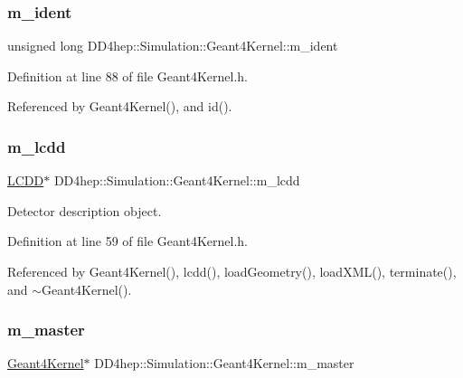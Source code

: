 \subsubsection{\texorpdfstring{m\+\_\+ident}{m\_ident}}
{\footnotesize\ttfamily unsigned long D\+D4hep\+::\+Simulation\+::\+Geant4\+Kernel\+::m\+\_\+ident\hspace{0.3cm}{\ttfamily [protected]}}



Definition at line 88 of file Geant4\+Kernel.\+h.



Referenced by Geant4\+Kernel(), and id().

\hypertarget{class_d_d4hep_1_1_simulation_1_1_geant4_kernel_a0181177a7c4b6862a83b3a34a64a3ce9}{}\label{class_d_d4hep_1_1_simulation_1_1_geant4_kernel_a0181177a7c4b6862a83b3a34a64a3ce9} 
\subsubsection{\texorpdfstring{m\+\_\+lcdd}{m\_lcdd}}
{\footnotesize\ttfamily \hyperlink{class_d_d4hep_1_1_simulation_1_1_geant4_kernel_a190e652b62ebce3db3372c4265ffa5a3}{L\+C\+DD}$\ast$ D\+D4hep\+::\+Simulation\+::\+Geant4\+Kernel\+::m\+\_\+lcdd\hspace{0.3cm}{\ttfamily [protected]}}



Detector description object. 



Definition at line 59 of file Geant4\+Kernel.\+h.



Referenced by Geant4\+Kernel(), lcdd(), load\+Geometry(), load\+X\+M\+L(), terminate(), and $\sim$\+Geant4\+Kernel().

\hypertarget{class_d_d4hep_1_1_simulation_1_1_geant4_kernel_a5d1ef9677e88ba8fc503d1cb70b84cf8}{}\label{class_d_d4hep_1_1_simulation_1_1_geant4_kernel_a5d1ef9677e88ba8fc503d1cb70b84cf8} 
\subsubsection{\texorpdfstring{m\+\_\+master}{m\_master}}
{\footnotesize\ttfamily \hyperlink{class_d_d4hep_1_1_simulation_1_1_geant4_kernel}{Geant4\+Kernel}$\ast$ D\+D4hep\+::\+Simulation\+::\+Geant4\+Kernel\+::m\+\_\+master\hspace{0.3cm}{\ttfamily [protected]}}



